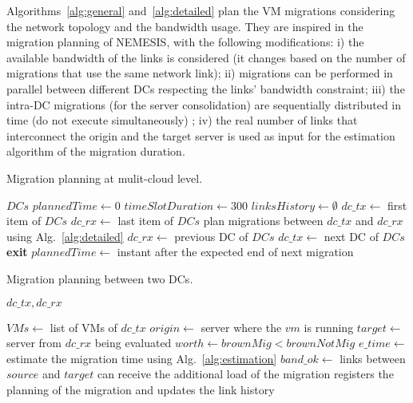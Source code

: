 Algorithms~\ref{alg:general} and~\ref{alg:detailed} plan the VM migrations considering the network topology and the bandwidth usage. They are inspired in the migration planning of NEMESIS, with the following modifications: i) the available bandwidth of the links is considered (it changes based on the number of migrations that use the same network link); ii) migrations can be performed in parallel between different DCs respecting the links' bandwidth constraint; iii) the intra-DC migrations (for the server consolidation) are sequentially distributed in time (do not execute simultaneously) ; iv) the real number of links that interconnect the origin and the target server is used as input for the estimation algorithm of the migration duration.

\begin{algorithm}[h]
\begin{algorithmic}
\caption{Migration planning at mulit-cloud level.}\label{alg:general}

\State $DCs$ 
\State $plannedTime \gets 0$
\State $timeSlotDuration \gets 300$
\State $linksHistory \gets \emptyset$
\State $dc\_tx \gets $ first item of $DCs$  %
        \State $dc\_rx \gets $ last item of $DCs$
            \State plan migrations between $dc\_tx$ and $dc\_rx$ using Alg.~\ref{alg:detailed}
            \State $dc\_rx \gets$ previous DC of $DCs$
            \EndWhile
        \EndIf
        \State $dc\_tx \gets$ next DC of $DCs$
    \EndWhile
       \State \textbf{exit}
    \EndIf
    \State $plannedTime \gets$  instant after the expected end of next migration 
\EndWhile
\end{algorithmic}
\end{algorithm}


\begin{algorithm}[h]
\begin{algorithmic}
\caption{Migration planning between two DCs.}\label{alg:detailed}
\Require $dc\_tx,dc\_rx$

\State $VMs \gets$ list of VMs of $dc\_tx$
    \State $origin \gets$ server where the $vm$ is running
    \State $target \gets$ server from $dc\_rx$ being evaluated
    \State $worth \gets brownMig < brownNotMig $
    \State $e\_time \gets $ estimate the migration time using Alg.~\ref{alg:estimation} 
    \State $band\_ok \gets$ links between $source$ and $target$ can receive the additional load of the migration
    \State registers the planning of the migration and updates the link history   
    \EndIf
\EndFor

\end{algorithmic}
\end{algorithm}

